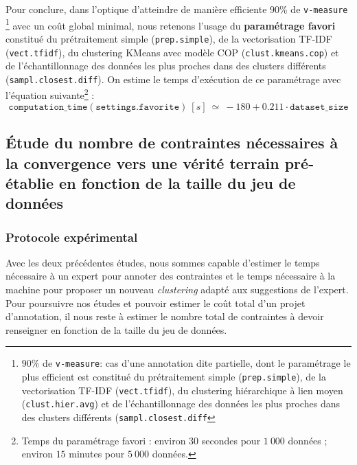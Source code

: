 			Pour conclure, dans l'optique d'atteindre de manière efficiente $90$\% de \texttt{v-measure}
			\footnote{$90$\% de \texttt{v-measure}: cas d'une annotation dite partielle, dont le paramétrage le plus efficient est constitué du prétraitement simple (\texttt{prep.simple}), de la vectorisation TF-IDF (\texttt{vect.tfidf}), du clustering hiérarchique à lien moyen (\texttt{clust.hier.avg}) et de l'échantillonnage des données les plus proches dans des clusters différents (\texttt{sampl.closest.diff}}
			avec un coût global minimal, nous retenons l'usage du \textbf{paramétrage favori} constitué du prétraitement simple (\texttt{prep.simple}), de la vectorisation TF-IDF (\texttt{vect.tfidf}), du clustering KMeans avec modèle COP (\texttt{clust.kmeans.cop}) et de l'échantillonnage des données les plus proches dans des clusters différents (\texttt{sampl.closest.diff}).
			On estime le temps d'exécution de ce paramétrage avec l'équation suivante\footnote{Temps du paramétrage favori : environ $30$ secondes pour $1~000$ données ; environ $15$ minutes pour $5~000$ données.} :
			\begin{equation}
				\label{equation:4.3.2-ETUDE-COUTS-TEMPS-CALCUL-PARAMETRAGE-FAVORI}
				\texttt{computation\_time}(\texttt{settings.favorite})~[s]~
				\simeq~-180 + 0.211 \cdot \texttt{dataset\_size}
			\end{equation}
	
	\subsection{Étude du nombre de contraintes nécessaires à la convergence vers une vérité terrain pré-établie en fonction de la taille du jeu de données}
	\label{section:4.3.3-ETUDE-COUT-NOMBRE-CONTRAINTES}
	
		\subsubsection{Protocole expérimental}
			
			Avec les deux précédentes études, nous sommes capable d'estimer le temps nécessaire à un expert pour annoter des contraintes et le temps nécessaire à la machine pour proposer un nouveau \textit{clustering} adapté aux suggestions de l'expert.
			Pour poursuivre nos études et pouvoir estimer le coût total d'un projet d'annotation, il nous reste à estimer le nombre total de contraintes à devoir renseigner en fonction de la taille du jeu de données.
			
